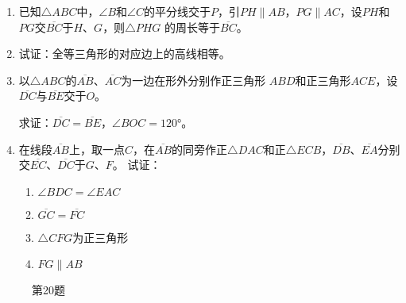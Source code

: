 \begin{enumerate}
\item 已知$\triangle ABC$中，$\angle B$和$\angle C$的平分线交于$P$，引$PH\parallel
AB$，$PG\parallel AC$，设$PH$和$PG$交$\overline{BC}$于$H$、$G$，则$\triangle PHG$
的周长等于$\overline{BC}$。
\item 试证：全等三角形的对应边上的高线相等。
\item 以$\triangle ABC$的$\overline{AB}$、$\overline{AC}$为一边在形外分别作正三角形
$ABD$和正三角形$ACE$，设$\overline{DC}$与$\overline{BE}$交于$O$。

求证：$\overline{DC}=\overline{BE}$，$\angle BOC=\ang{120}$。
\item 在线段$\overline{AB}$上，取一点$C$，在$\overline{AB}$的同旁作正$\triangle DAC$和正$\triangle ECB$，$\overline{DB}$、$\overline{EA}$分别交$\overline{EC}$、$\overline{DC}$于$G$、$F$。
试证：
\begin{enumerate}
    \item $\angle BDC=\angle EAC$
    \item $\overline{GC}=\overline{FC}$
    \item $\triangle CFG$为正三角形
    \item $FG\parallel AB$
\end{enumerate}
\end{enumerate}

\begin{figure}
    \begin{minipage}[t]{0.48\linewidth}
    \centering
\begin{tikzpicture}[scale=1.2]
\end{tikzpicture}
    \caption*{第20题}
    \end{minipage}
    \begin{minipage}[t]{0.48\linewidth}
    \centering
    \begin{tikzpicture}[>=latex, scale=1]
    \end{tikzpicture}
    \caption{}
    \end{minipage}
    \end{figure}


